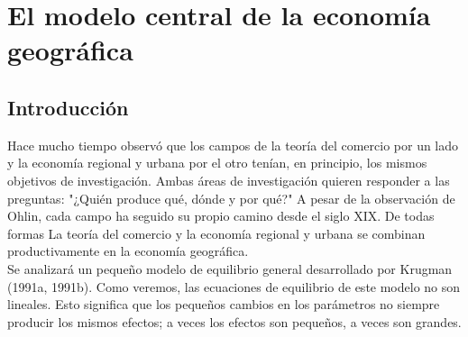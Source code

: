 \chapter{El modelo central de la economía geográfica}

\section{Introducción}
Hace mucho tiempo observó que los campos de la teoría del comercio por un lado y la economía regional y urbana por el otro tenían, en principio, los mismos objetivos de investigación. Ambas áreas de investigación quieren responder a las preguntas: "¿Quién produce qué, dónde y por qué?" A pesar de la observación de Ohlin, cada campo ha seguido su propio camino desde el siglo XIX. De todas formas La teoría del comercio y la economía regional y urbana se combinan productivamente en la economía geográfica.\\
Se analizará un pequeño modelo de equilibrio general desarrollado por Krugman (1991a, 1991b). Como veremos, las ecuaciones de equilibrio de este modelo no son lineales. Esto significa que los pequeños cambios en los parámetros no siempre producir los mismos efectos; a veces los efectos son pequeños, a veces son grandes. 

